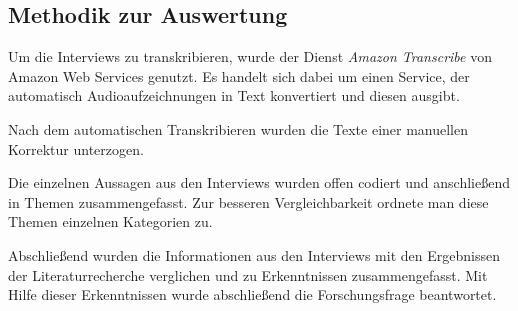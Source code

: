 \subsection{Methodik zur Auswertung}

Um die Interviews zu transkribieren, wurde der Dienst \textit{Amazon Transcribe} von Amazon Web Services genutzt. Es handelt sich dabei um einen Service, der automatisch Audioaufzeichnungen in Text konvertiert und diesen ausgibt.

Nach dem automatischen Transkribieren wurden die Texte einer manuellen Korrektur unterzogen.

Die einzelnen Aussagen aus den Interviews wurden offen codiert und anschließend in Themen zusammengefasst. Zur besseren Vergleichbarkeit ordnete man  diese Themen einzelnen Kategorien zu.

Abschließend wurden die Informationen aus den Interviews mit den Ergebnissen der Literaturrecherche verglichen und zu Erkenntnissen zusammengefasst. Mit Hilfe dieser Erkenntnissen wurde abschließend die Forschungsfrage beantwortet.

